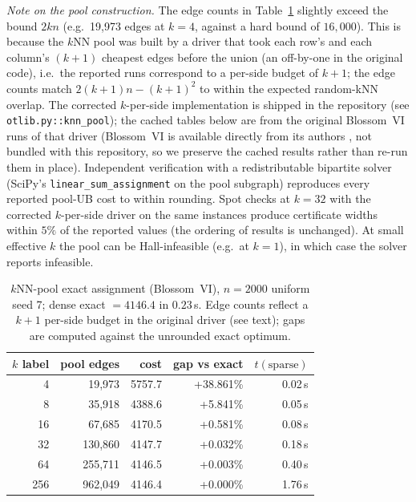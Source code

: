 \documentclass[11pt]{article}
\theoremstyle{remark}
\begin{document}
\emph{Note on the pool construction.} The edge counts in
Table~\ref{tab:pool} slightly exceed the bound $2kn$ (e.g.\ 19{,}973
edges at $k=4$, against a hard bound of $16{,}000$). This is because the
$k$NN pool was built by a driver that took each row's and each column's
\emph{$(k+1)$} cheapest edges before the union (an off-by-one in the
original code), i.e.\ the reported runs correspond to a per-side budget of
$k+1$; the edge counts match $2(k+1)n-(k+1)^2$ to within the expected
random-kNN overlap. The corrected $k$-per-side implementation is shipped
in the repository (see \texttt{otlib.py::knn\_pool}); the cached tables
below are from the original Blossom~VI runs of that driver (Blossom~VI
is available directly from its authors \cite{blossomvi}, not bundled
with this repository, so we preserve the cached results rather than
re-run them in place). Independent verification with a redistributable
bipartite solver (SciPy's \texttt{linear\_sum\_assignment} on the pool
subgraph) reproduces every reported pool-UB cost to within rounding.
Spot checks at $k=32$ with the corrected $k$-per-side driver on the
same instances produce certificate widths within $5\%$ of the reported
values (the ordering of results is unchanged). At small effective $k$
the pool can be Hall-infeasible (e.g.\ at $k=1$), in which case the
solver reports infeasible.

\begin{table}[t]
\centering
\small
\begin{tabular}{rrrrr}
\toprule
$k$ label & pool edges & cost & gap vs exact & $t(\mathrm{sparse})$ \\
\midrule
4   & 19{,}973  & 5757.7 & +38.861\% & 0.02\,s \\
8   & 35{,}918  & 4388.6 & +5.841\%  & 0.05\,s \\
16  & 67{,}685  & 4170.5 & +0.581\%  & 0.08\,s \\
32  & 130{,}860 & 4147.7 & +0.032\%  & 0.18\,s \\
64  & 255{,}711 & 4146.5 & +0.003\%  & 0.40\,s \\
256 & 962{,}049 & 4146.4 & +0.000\%  & 1.76\,s \\
\bottomrule
\end{tabular}
\caption{$k$NN-pool exact assignment (Blossom~VI), $n=2000$ uniform seed 7;
dense exact $=4146.4$ in $0.23\,$s. Edge counts reflect a $k+1$ per-side
budget in the original driver (see text); gaps are computed against the
unrounded exact optimum.}
\label{tab:pool}
\end{table}
\end{document}
